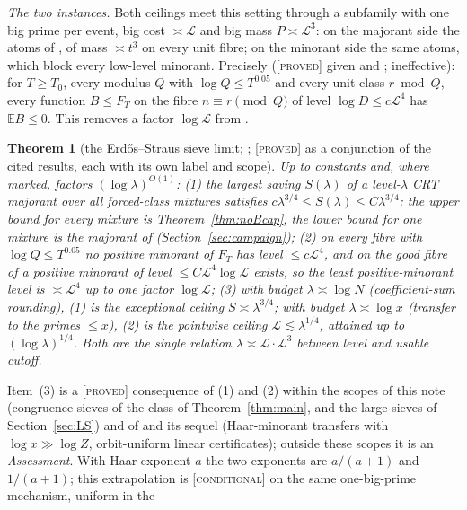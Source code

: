 \documentclass[10pt,reqno]{amsart}
\newtheorem{theorem}{Theorem}[section]
\theoremstyle{definition}
\theoremstyle{remark}
\newcommand{\E}{\mathbb E}
\newcommand{\lab}[1]{\textup{[\textsc{#1}]}}
\begin{document}
\emph{The two instances.}  Both ceilings meet this setting through a
subfamily with one big prime per event, big cost $\asymp\mathcal L$ and big mass
$P\asymp\mathcal L^3$: on the majorant side the atoms of \cite{TQ}, of mass $\asymp t^3$ on
every unit fibre; on the minorant side the same atoms, which block every
low-level minorant.  Precisely \cite[Prop.~4.2]{CU} (\lab{proved} given
\cite{TQ} and \cite[Thm~1.3]{O14}; ineffective): for $T\geq T_0$, every modulus $Q$
with $\log Q\leq T^{0.05}$ and every unit class $r\bmod Q$, every function $B\leq F_T$ on
the fibre $n\equiv r\pmod Q$ of level $\log D\leq c\mathcal L^4$ has $\E B\leq0$.  This
removes a factor $\log\mathcal L$ from \cite[Thm~4.5]{O14}.

\begin{theorem}[the Erd\H{o}s--Straus sieve limit; {\cite[Thm~4.3]{CU}}; \lab{proved} as a conjunction of the cited results, each with its own label and scope]\label{thm:unified}
Up to constants and, where marked, factors $(\log\lambda)^{O(1)}$:
(1) the largest saving $S(\lambda)$ of a level-$\lambda$ CRT majorant over all forced-class
mixtures satisfies $c\lambda^{3/4}\leq S(\lambda)\leq C\lambda^{3/4}$: the upper bound for every
mixture is Theorem~\ref{thm:noBcap}, the lower bound for one mixture is the
majorant of \cite{TQ} (Section~\ref{sec:campaign});
(2) on every fibre with $\log Q\leq T^{0.05}$ no positive minorant of $F_T$ has level
$\leq c\mathcal L^4$, and on the good fibre of \cite[\S5]{O13} a positive minorant of
level $\leq C\mathcal L^4\log\mathcal L$ exists, so the least positive-minorant level is
$\asymp\mathcal L^4$ up to one factor $\log\mathcal L$;
(3) with budget $\lambda\asymp\log N$ (coefficient-sum rounding), (1) is the exceptional
ceiling $S\asymp\lambda^{3/4}$; with budget $\lambda\asymp\log x$ (transfer to the primes $\leq x$),
(2) is the pointwise ceiling $\mathcal L\lesssim\lambda^{1/4}$, attained up to $(\log\lambda)^{1/4}$.
Both are the single relation $\lambda\asymp\mathcal L\cdot\mathcal L^3$ between level and usable
cutoff.
\end{theorem}
Item~(3) is a \lab{proved} consequence of (1) and (2) within the scopes of
this note (congruence sieves of the class of Theorem~\ref{thm:main}, and the
large sieves of Section~\ref{sec:LS}) and of \cite{O14} and its sequel \cite{O15}
(Haar-minorant transfers with $\log x\gg\log Z$, orbit-uniform linear
certificates); outside these scopes it is an \emph{Assessment}.  With Haar
exponent $a$ the two exponents are $a/(a+1)$ and $1/(a+1)$; this extrapolation
is \lab{conditional} on the same one-big-prime mechanism, uniform in the
\end{document}
